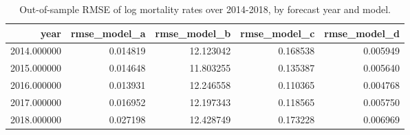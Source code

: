 \begin{table}[ht]
\centering
\begin{tabular}{rrrrr}
\hline
year & rmse_model_a & rmse_model_b & rmse_model_c & rmse_model_d \\
\hline
2014.000000 & 0.014819 & 12.123042 & 0.168538 & 0.005949 \\
2015.000000 & 0.014648 & 11.803255 & 0.135387 & 0.005640 \\
2016.000000 & 0.013931 & 12.246558 & 0.110365 & 0.004768 \\
2017.000000 & 0.016952 & 12.197343 & 0.118565 & 0.005750 \\
2018.000000 & 0.027198 & 12.428749 & 0.173228 & 0.006969 \\
\hline
\end{tabular}
\caption{Out-of-sample RMSE of log mortality rates over 2014-2018, by forecast year and model.}
\label{tab:revised_table_e2}
\end{table}
